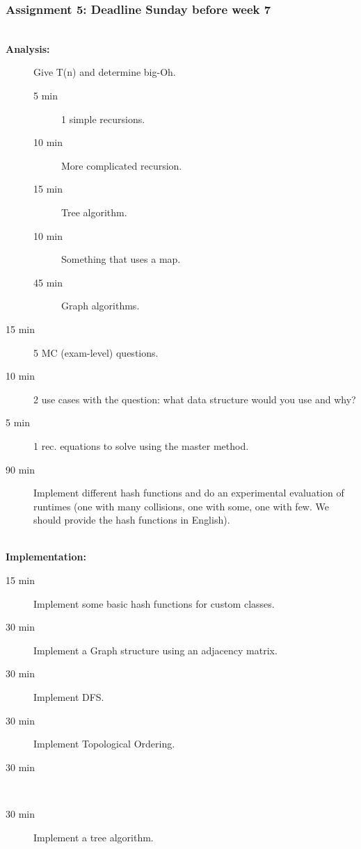 \newpage
\subsubsection{Assignment 5: Deadline Sunday before week 7}
\label{ssub:assignment_5}

\hfill\\
\textbf{Analysis:}\\
\begin{description}
	\item[] Give T(n) and determine big-Oh. 
		\begin{description}
			\item[5 min] 1 simple recursions.
			\item[10 min] More complicated recursion.
			\item[15 min] Tree algorithm.
			\item[10 min] Something that uses a map.
			\item[45 min] Graph algorithms. 
		\end{description}
	\item[15 min] 5 MC (exam-level) questions.
	\item[10 min] 2 use cases with the question: what data structure would you use and why?
	\item[5 min] 1 rec. equations to solve using the master method.
	\item[90 min] Implement different hash functions and do an experimental evaluation of runtimes (one with many
		collisions, one with some, one with few. We should provide the hash functions in English).
\end{description}

\hfill\\
\textbf{Implementation:}\\
\begin{description}
	\item[15 min] Implement some basic hash functions for custom classes.
	\item[30 min] Implement a Graph structure using an adjacency matrix.
	\item[30 min] Implement DFS.
	\item[30 min] Implement Topological Ordering.
	\item[30 min] \hfill\\
	\item[30 min] Implement a tree algorithm.
\end{description}

